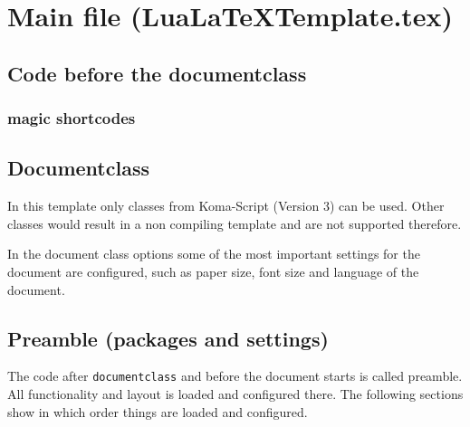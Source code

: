 \chapter{Main file (LuaLaTeXTemplate.tex)}
\label{chap:doc:MainFile}

\section{Code before the documentclass}
\label{sec:main:prefix}

\subsection{magic shortcodes}

\section{Documentclass}
\label{sec:main:class}
In this template only classes from Koma-Script (Version 3) can be used.
Other classes would result in a non compiling template and are not supported therefore. 

In the document class options some of the most important settings for the document are configured, such as paper size, font size and language of the document.

\section{Preamble (packages and settings)}
\label{sec:doc:preamble}

The code after \texttt{documentclass} and before the document starts is called preamble. All functionality and layout is loaded and configured there. The following sections show in which order things are loaded and configured.

